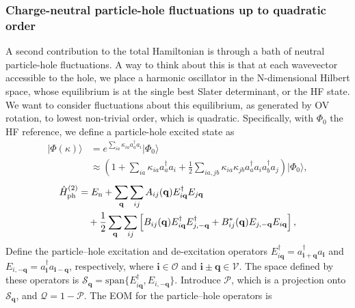 \subsubsection{Charge-neutral particle-hole fluctuations up to quadratic order}
A second contribution to the total Hamiltonian is through a bath of neutral particle-hole fluctuations. 
A way to think about this is that at each wavevector accessible to the hole, we place a harmonic oscillator in the N-dimensional Hilbert space, whose equilibrium is at the single best Slater determinant, or the HF state. We want to consider fluctuations about this equilibrium, as generated by OV rotation, to lowest non-trivial order, which is quadratic. 
Specifically, with $\Phi_0$ the HF reference, we define a particle-hole excited state as
\begin{align}
    |\Phi(\kappa)\rangle &= e^{\sum_{ia}\kappa_{ia}a_a^\dagger a_i}|\Phi_0\rangle \\
    &\approx \left(1 + \sum_{ia}\kappa_{ia}a_a^\dagger a_i + \frac{1}{2}\sum_{ia,jb}\kappa_{ia}\kappa_{jb}a_a^\dagger a_i a_b^\dagger a_j\right)|\Phi_0\rangle,
\end{align}
\begin{align}
    \hat H_{\rm ph}^{(2)}
    &=
    E_{\rm n}
    +
    \sum_{\mathbf q}\sum_{ij}
    A_{ij}(\mathbf q)
    E_{i\mathbf q}^{\dagger}
    E_{j\mathbf q}
    \nonumber\\
    &\quad
    +
    \frac{1}{2}
    \sum_{\mathbf q}\sum_{ij}
    \left[
        B_{ij}(\mathbf q)
        E_{i\mathbf q}^{\dagger}
        E_{j,-\mathbf q}^{\dagger}
        +
        B_{ij}^{*}(\mathbf q)
        E_{j,-\mathbf q}
        E_{i\mathbf q}
    \right],
    \label{eq:quadratic_neutral_hamiltonian}
\end{align}
Define the particle--hole excitation and de-excitation operators  $
    E_{i\mathbf q}^{\dagger}
    =
    a_{\mathbf{i}+\mathbf q}^{\dagger}a_{\mathbf i}$ and $
    E_{i,-\mathbf q}
    =
    a_{\mathbf i}^{\dagger}a_{\mathbf{i}-\mathbf q}$, respectively,
where $\mathbf i\in\mathcal O$ and
$\mathbf{i}\pm\mathbf q\in\mathcal V$. The space defined by these operators is $\mathcal{S}_{\mathbf q}=\text{span}\{E_{i\mathbf q}^{\dagger},E_{i,-\mathbf q}\}$. Introduce $\mathcal{P}$, which is a projection onto $\mathcal{S}_{\mathbf q}$, and $\mathcal{Q} = 1-\mathcal{P}$. The EOM for the particle--hole operators is
